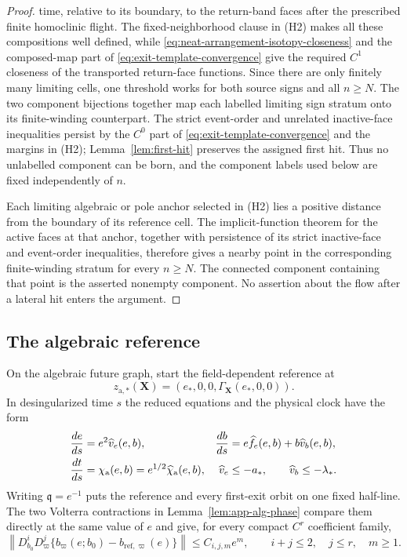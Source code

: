 \documentclass[11pt]{amsart}
\numberwithin{equation}{section}
\theoremstyle{definition}
\theoremstyle{remark}
\begin{document}
\begin{proof}
time, relative to its boundary, to the return-band faces after the prescribed
finite homoclinic flight.  The fixed-neighborhood clause in \textup{(H2)}
makes all these compositions well defined, while
\eqref{eq:neat-arrangement-isotopy-closeness} and the composed-map part of
\eqref{eq:exit-template-convergence} give the required $C^1$ closeness of
the transported return-face functions.  Since there are only finitely
many limiting cells, one threshold works for both source signs and all
$n\ge N$.  The two component bijections together map each labelled
limiting sign stratum onto its finite-winding counterpart.  The strict
event-order and unrelated inactive-face inequalities persist by the $C^0$
part of \eqref{eq:exit-template-convergence} and the margins in
\textup{(H2)}; Lemma~\ref{lem:first-hit} preserves the assigned first hit.
Thus no unlabelled component can be born, and
the component labels used below are fixed independently of $n$.

Each limiting algebraic or pole anchor selected in \textup{(H2)} lies a
positive distance from the boundary of its reference cell.  The
implicit-function theorem for the
active faces at that anchor, together with persistence of its strict
inactive-face and event-order inequalities, therefore gives a nearby point
in the corresponding finite-winding stratum for every $n\ge N$.  The
connected component containing that point is the asserted nonempty
component.  No assertion about the flow after a lateral hit enters the
argument.
\end{proof}

\subsection{The algebraic reference}

On the algebraic future graph, start the field-dependent reference at
\begin{equation}\label{eq:alg-fixed-cut}
 z_{\mathrm a,*}(\mathbf X)=
 (e_*,0,0,\Gamma_{\mathbf X}(e_*,0,0)).
\end{equation}
In desingularized time $s$ the reduced equations and the physical clock
have the form
\begin{align}
 \frac{de}{ds}&=e^2\widehat v_e(e,b),
 &\frac{db}{ds}&=e\widehat f_e(e,b)+b\widehat v_b(e,b),
 \label{eq:alg-reduced}\\
 \frac{dt}{ds}&=\chi_{\mathrm a}(e,b)
 =e^{1/2}\widehat\chi_{\mathrm a}(e,b),
 &\widehat v_e&\le-a_*,\qquad \widehat v_b\le-\lambda_*.
 \notag
\end{align}
Writing $\mathfrak q=e^{-1}$ puts the reference and every first-exit orbit
on one fixed half-line.  The two Volterra contractions in
Lemma~\ref{lem:app-alg-phase} compare them directly at the same value of
$e$ and give, for every compact $C^r$ coefficient family,
\begin{equation}\label{eq:alg-flat-shadowing}
 \left\|D_{b_0}^iD_\varpi^j
 \{b_\varpi(e;b_0)-b_{\mathrm{ref},\varpi}(e)\}\right\|
 \le C_{i,j,m}e^m,
 \qquad i+j\le2,\quad j\le r,\quad m\ge1.
\end{equation}
\end{document}
